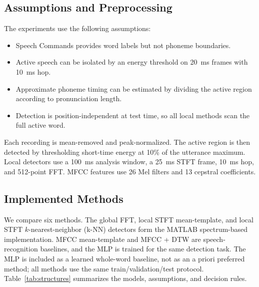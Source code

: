 \documentclass[conference]{IEEEtran}
\begin{document}
\subsection{Assumptions and Preprocessing}
The experiments use the following assumptions:
\begin{itemize}
    \item Speech Commands provides word labels but not phoneme boundaries.
    \item Active speech can be isolated by an energy threshold on 20~ms frames with 10~ms hop.
    \item Approximate phoneme timing can be estimated by dividing the active region according to pronunciation length.
    \item Detection is position-independent at test time, so all local methods scan the full active word.
\end{itemize}

Each recording is mean-removed and peak-normalized. The active region is then detected by thresholding short-time energy at 10\% of the utterance maximum. Local detectors use a 100~ms analysis window, a 25~ms STFT frame, 10~ms hop, and 512-point FFT. MFCC features use 26 Mel filters and 13 cepstral coefficients.

\subsection{Implemented Methods}
We compare six methods. The global FFT, local STFT mean-template, and local STFT $k$-nearest-neighbor (k-NN) detectors form the MATLAB spectrum-based implementation. MFCC mean-template and MFCC + DTW are speech-recognition baselines, and the MLP is trained for the same detection task. The MLP is included as a learned whole-word baseline, not as an a priori preferred method; all methods use the same train/validation/test protocol. Table~\ref{tab:structures} summarizes the models, assumptions, and decision rules.
\end{document}
